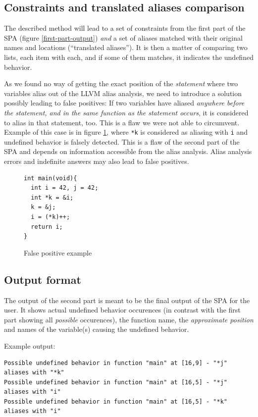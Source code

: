 \subsection{Constraints and translated aliases comparison}\label{flaw}
The described method will lead to a set of constraints from the first part of the SPA (figure \ref{first-part-output}) \emph{and} a set of aliases matched with their original names and locations (``translated aliases''). It is then a matter of comparing two lists, each item with each, and if some of them matches, it indicates the undefined behavior.

As we found no way of getting the exact position of the \emph{statement} where two variables alias out of the LLVM alias analysis, we need to introduce a solution possibly leading to false positives: If two variables have aliased \emph{anywhere before the statement, and in the same function as the statement occurs}, it is considered to alias in that statement, too. This is a flaw we were not able to circumvent. Example of this case is in figure \ref{example-alias-before}, where \verb|*k| is considered as aliasing with \verb|i| and undefined behavior is falsely detected. This is a flaw of the second part of the SPA and depends on information accessible from the alias analysis. Alias analysis errors and indefinite answers may also lead to false positives.
\begin{figure}
\caption{False positive example}
\label{example-alias-before}
\begin{lstlisting}
int main(void){
  int i = 42, j = 42;
  int *k = &i;
  k = &j;
  i = (*k)++;
  return i;
}
\end{lstlisting}
\end{figure}
\subsection{Output format}
The output of the second part is meant to be the final output of the SPA for the user. It shows actual undefined behavior occurences (in contrast with the first part showing all \emph{possible} occurences), the function name, the \emph{approximate position} and names of the variable(s) causing the undefined behavior.

Example output:
\begin{lstlisting}
Possible undefined behavior in function "main" at [16,9] - "*j" aliases with "*k"
Possible undefined behavior in function "main" at [16,5] - "*j" aliases with "i"
Possible undefined behavior in function "main" at [16,5] - "*k" aliases with "i"
\end{lstlisting}

